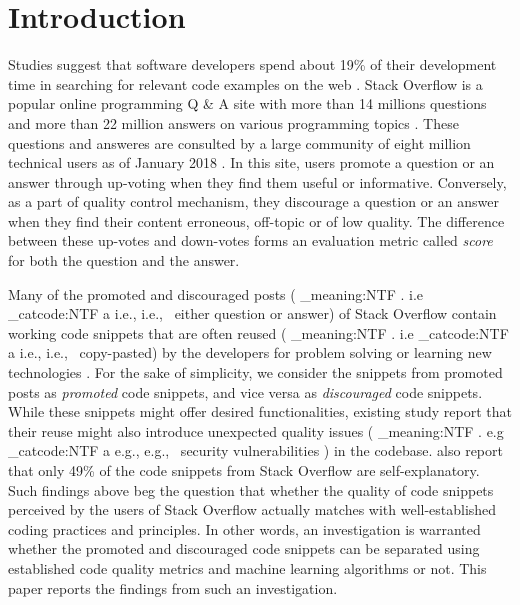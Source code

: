 \documentclass[conference]{IEEEtran}
\makeatletter
\newcommand\latinabbrev[1]{
  \peek_meaning:NTF . {%
    #1\@}%
  { \peek_catcode:NTF a {%
      #1., \@ }%
    {#1., \@}}}
\def\eg{\latinabbrev{e.g}}
\def\ie{\latinabbrev{i.e}}
\makeatother
\begin{document}
\IEEEpeerreviewmaketitle

\section{Introduction}
Studies suggest that software developers spend about 19\% of their development time in searching for relevant code examples on the web \cite{twostudy,koderlog}. Stack Overflow is a popular online programming Q \& A site with more than 14 millions questions and more than 22 million answers on various programming topics \cite{nlp2code}. These questions and answeres are consulted by a large community of eight million technical users as of January 2018 \cite{sowiki}. In this site, users promote a question or an answer through up-voting when they find them useful or informative. Conversely, as a part of quality control mechanism, they discourage a question or an answer when they find their content erroneous, off-topic or of low quality. The difference between these up-votes and down-votes forms an evaluation metric called \emph{score} for both the question and the answer.

Many of the promoted and discouraged posts (\ie\ either question or answer) of Stack Overflow contain working code snippets that are often reused (\ie\ copy-pasted) by the developers for problem solving or learning new technologies \cite{rabe}. For the sake of simplicity, we consider the snippets from promoted posts as \emph{promoted} code snippets, and vice versa as \emph{discouraged} code snippets. While these snippets might offer desired functionalities, existing study report that their reuse might also introduce unexpected quality issues (\eg\ security vulnerabilities \cite{security}) in the codebase. \citet{understanding} also report that only 49\% of the code snippets from Stack Overflow are self-explanatory. 
Such findings above beg the question that whether the quality of code snippets perceived by the users of Stack Overflow actually matches with well-established coding practices and principles. In other words, an investigation is warranted whether the promoted and discouraged code snippets can be separated using established code quality metrics and machine learning algorithms or not. This paper reports the findings from such an investigation.
\end{document}
